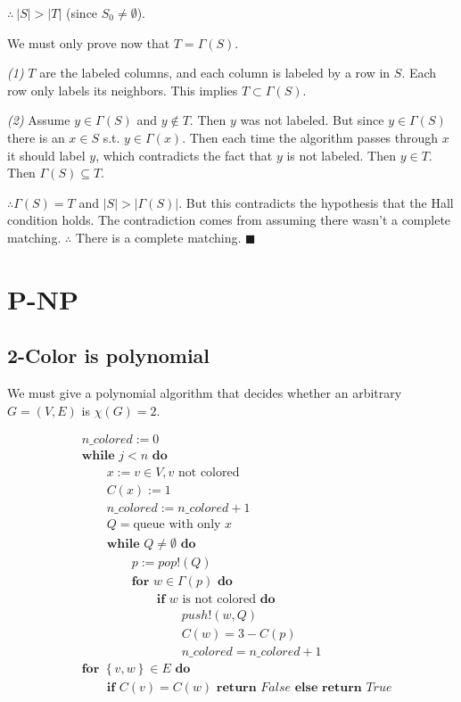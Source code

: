 \documentclass[a4paper, 12pt]{article}
\begin{document}
$\therefore ~ |S| > |T|$ (since $S_0 \neq \emptyset$).

We must only prove now that $T = \Gamma(S)$. 

\textit{(1)} $T$ are the labeled columns, and each column is labeled by a row in $S$.
Each row only labels its neighbors. This implies $T \subset \Gamma(S)$.

\textit{(2)} Assume $y \in \Gamma(S)$ and $y \not\in T$. Then $y$ was 
not labeled. But since $y \in \Gamma(S)$ there is an 
$x \in S$ s.t. $y \in \Gamma(x)$. Then each time 
the algorithm passes through $x$ it should label 
$y$, which contradicts the fact that $y$ is not 
labeled. Then $y \in T$. Then $\Gamma(S) \subseteq T$.

$\therefore \Gamma(S) = T$ and $|S| > |\Gamma(S)|$. But this contradicts 
the hypothesis that the Hall condition holds. The 
contradiction comes from assuming there wasn't a 
complete matching. $\therefore $ There is a complete
matching. $\blacksquare$

\pagebreak
\section{P-NP}

\subsection{2-Color is polynomial}

We must give a polynomial algorithm that decides whether an arbitrary $G = (V,
E)$ is $\chi(G) = 2$. 

\begin{align*}
    &n\_colored := 0 \\ 
    &\textbf{while } j < n \textbf{ do }\\ 
    &\qquad x := v \in V, v \text{ not colored} \\ 
    &\qquad C(x) := 1 \\ 
    &\qquad n\_colored :=  n\_colored + 1 \\ 
    & \qquad Q = \text{queue with only } x \\ 
    & \qquad\textbf{while } Q \neq \emptyset \textbf{ do } \\ 
    & \qquad \qquad p := pop!(Q) \\ 
    & \qquad \qquad \textbf{for } w \in \Gamma(p) \textbf{ do } \\ 
    & \qquad\qquad\qquad \textbf{if } w \text{ is not colored } \textbf{do} \\ 
    & \qquad\qquad\qquad\qquad push!(w, Q) \\ 
    & \qquad\qquad\qquad\qquad C(w) = 3 - C(p) \\ 
    & \qquad\qquad\qquad\qquad n\_colored = n\_colored + 1 \\ 
    & \textbf{for } \left\{ v, w \right\} \in  E \textbf{ do }\\ 
    & \qquad\textbf{if } C(v) = C(w) \textbf{ return } False \textbf{ else } \textbf{return } True
\end{align*}
\end{document}

